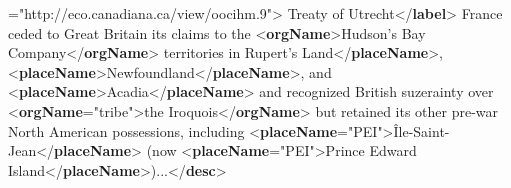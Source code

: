 \begin{shaded}
{\hspace*{1em}\hspace*{1em}\hspace*{1em}{ref}="{http://eco.canadiana.ca/view/oocihm.9}">}\mbox{}\newline 
\hspace*{1em}\hspace*{1em}Treaty of Utrecht{</\textbf{label}>}\mbox{}\newline 
\hspace*{1em}\hspace*{1em}France ceded to Great Britain its claims to the {<\textbf{orgName}>}Hudson's Bay Company{</\textbf{orgName}>} territories in\mbox{}\newline 
\hspace*{1em}\hspace*{1em}Rupert's Land{</\textbf{placeName}>}, {<\textbf{placeName}>}Newfoundland{</\textbf{placeName}>}, and {<\textbf{placeName}>}Acadia{</\textbf{placeName}>} and\mbox{}\newline 
\hspace*{1em}\hspace*{1em}\hspace*{1em}\hspace*{1em}\hspace*{1em}\hspace*{1em} recognized British suzerainty over {<\textbf{orgName}\hspace*{1em}{type}="{tribe}">}the Iroquois{</\textbf{orgName}>} but retained its other pre-war\mbox{}\newline 
\hspace*{1em}\hspace*{1em}\hspace*{1em}\hspace*{1em}\hspace*{1em}\hspace*{1em} North American possessions, including {<\textbf{placeName}\hspace*{1em}{key}="{PEI}">}Île-Saint-Jean{</\textbf{placeName}>} (now {<\textbf{placeName}\hspace*{1em}{key}="{PEI}">}Prince Edward Island{</\textbf{placeName}>})...{</\textbf{desc}>}\mbox{}\newline 
\hspace*{1em}\mbox{}\newline 

\end{shaded}

